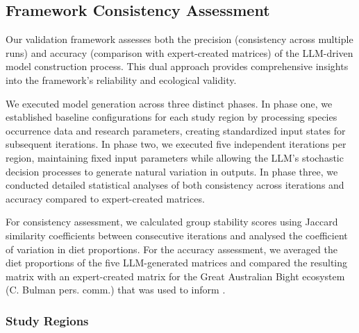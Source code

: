 \subsection{Framework Consistency Assessment}

Our validation framework assesses both the precision (consistency across multiple runs) and accuracy (comparison with expert-created matrices) of the LLM-driven model construction process. This dual approach provides comprehensive insights into the framework's reliability and ecological validity.

We executed model generation across three distinct phases. In phase one, we established baseline configurations for each study region by processing species occurrence data and research parameters, creating standardized input states for subsequent iterations. In phase two, we executed five independent iterations per region, maintaining fixed input parameters while allowing the LLM's stochastic decision processes to generate natural variation in outputs. In phase three, we conducted detailed statistical analyses of both consistency across iterations and accuracy compared to expert-created matrices.

For consistency assessment, we calculated group stability scores using Jaccard similarity coefficients between consecutive iterations and analysed the coefficient of variation in diet proportions. For the accuracy assessment, we averaged the diet proportions of the five LLM-generated matrices and compared the resulting matrix with an expert-created matrix for the Great Australian Bight ecosystem (C. Bulman pers. comm.) that was used to inform \citep{Fulton2018}. 

\subsubsection{Study Regions}

